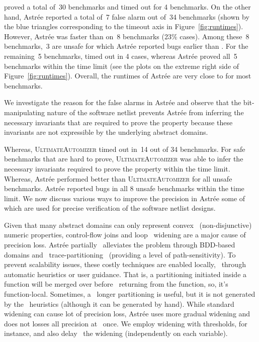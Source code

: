 %
\ABC proved a total of~30 benchmarks and timed out for 4 benchmarks.  
On the other hand, Astr{\'e}e reported a total of~7 false alarm out of~34 
benchmarks (shown by the blue triangles corresponding to the timeout axis in 
Figure~\ref{fig:runtimes}). However, Astr{\'e}e was faster than \ABC on~8 benchmarks (23\% cases).
%
Among these~8 benchmarks,~3 are unsafe for which Astr{\'e}e reported bugs
earlier than \ABC. For the remaining~5 benchmarks, \ABC timed out in 4 cases, 
whereas Astr{\'e}e proved all~5 benchmarks within the time limit (see the plots 
on the extreme right side of Figure~\ref{fig:runtimes}).  
%
Overall, the runtimes of Astr{\'e}e are very close to \ABC for most benchmarks. 
%

We investigate the reason for the false alarms in Astr{\'e}e and observe that 
the bit-manipulating nature of the software netlist prevents Astr{\'e}e from 
inferring the necessary invariants that are required to prove the property 
because these invariants are not expressible by the underlying abstract domains. 

Whereas, \textsc{UltimateAutomizer} timed out in~14 
out of 34 benchmarks. For safe benchmarks that are hard to prove, \textsc{UltimateAutomizer} 
was able to infer the necessary invariants required to prove the property within 
the time limit. 
Whereas, Astr{\'e}e performed better than \textsc{UltimateAutomizer} for all 
unsafe benchmarks.  Astr{\'e}e reported bugs in all 8 unsafe benchmarks within 
the time limit.  We now discuss various ways to improve the precision in
Astr{\'e}e some of which are used for precise verification of the software
netlist designs. 

%
%
%
Given that many abstract domains can only represent convex  
(non-disjunctive) numeric properties, control-flow joins and loop  
widening are a major cause of precision loss.  Astr{\'e}e partially  
alleviates the problem through BDD-based domains and 
trace-partitioning~\cite{DBLP:journals/toplas/RivalM07}
(providing a level of path-sensitivity). 
To prevent scalability issues, these costly techniques are enabled locally, 
through automatic heuristics or user guidance.  That is, a partitioning 
initiated inside a function will be merged over before  
returning from the function, so, it's function-local. Sometimes, a  
longer partitioning is useful, but it is not generated by the  
heuristics (although it can be generated by hand).  While standard 
widening can cause lot of precision loss, Astr{\'e}e 
uses more gradual widening and does not losses all precision at  
once.  We employ widening with thresholds, for instance, and also delay  
the widening (independently on each variable).  


